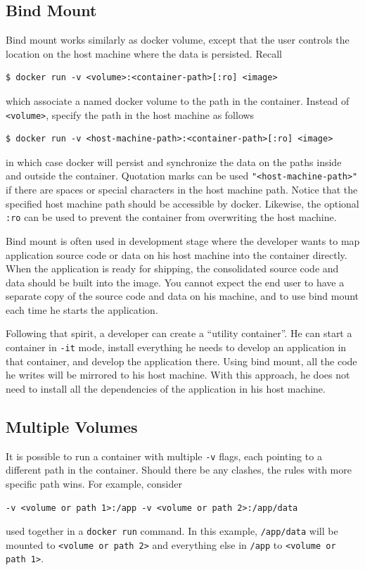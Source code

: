 \subsection{Bind Mount}

Bind mount works similarly as docker volume, except that the user controls the location on the host machine where the data is persisted. Recall
\begin{lstlisting}
$ docker run -v <volume>:<container-path>[:ro] <image>
\end{lstlisting}
which associate a named docker volume to the path in the container. Instead of \verb|<volume>|, specify the path in the host machine as follows
\begin{lstlisting}
$ docker run -v <host-machine-path>:<container-path>[:ro] <image>
\end{lstlisting}
in which case docker will persist and synchronize the data on the paths inside and outside the container. Quotation marks can be used \verb|"<host-machine-path>"| if there are spaces or special characters in the host machine path. Notice that the specified host machine path should be accessible by docker. Likewise, the optional \verb|:ro| can be used to prevent the container from overwriting the host machine.

Bind mount is often used in development stage where the developer wants to map application source code or data on his host machine into the container directly. When the application is ready for shipping, the consolidated source code and data should be built into the image. You cannot expect the end user to have a separate copy of the source code and data on his machine, and to use bind mount each time he starts the application. 

Following that spirit, a developer can create a ``utility container''. He can start a container in \verb|-it| mode, install everything he needs to develop an application in that container, and develop the application there. Using bind mount, all the code he writes will be mirrored to his host machine. With this approach, he does not need to install all the dependencies of the application in his host machine.

\subsection{Multiple Volumes}

It is possible to run a container with multiple \verb|-v| flags, each pointing to a different path in the container. Should there be any clashes, the rules with more specific path wins. For example, consider
\begin{lstlisting}
-v <volume or path 1>:/app -v <volume or path 2>:/app/data
\end{lstlisting} 
used together in a \verb|docker run| command. In this example, \verb|/app/data| will be mounted to \verb|<volume or path 2>| and everything else in \verb|/app| to \verb|<volume or path 1>|. 

